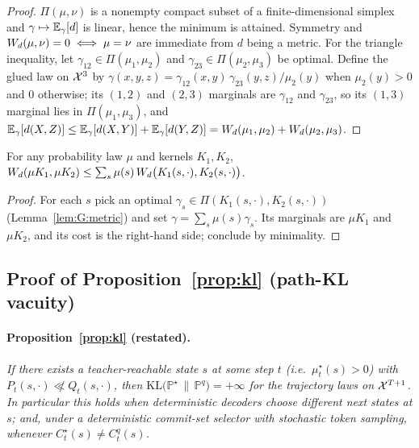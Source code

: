 \begin{proof}
$\Pi(\mu,\nu)$ is a nonempty compact subset of a finite-dimensional simplex and
$\gamma\mapsto\mathbb{E}_{\gamma}[d]$ is linear, hence the minimum is attained. Symmetry and
$W_{d}(\mu,\nu)=0\iff\mu=\nu$ are immediate from $d$ being a metric. For the triangle inequality,
let $\gamma_{12}\in\Pi(\mu_{1},\mu_{2})$ and $\gamma_{23}\in\Pi(\mu_{2},\mu_{3})$ be optimal.
Define the glued law on $\mathcal{X}^{3}$ by
$\gamma(x,y,z)=\gamma_{12}(x,y)\,\gamma_{23}(y,z)/\mu_{2}(y)$ when $\mu_{2}(y)>0$ and $0$
otherwise; its $(1,2)$ and $(2,3)$ marginals are $\gamma_{12}$ and $\gamma_{23}$, so its $(1,3)$
marginal lies in $\Pi(\mu_{1},\mu_{3})$, and
$\mathbb{E}_{\gamma}[d(X,Z)]\le\mathbb{E}_{\gamma}[d(X,Y)]+\mathbb{E}_{\gamma}[d(Y,Z)]
=W_{d}(\mu_{1},\mu_{2})+W_{d}(\mu_{2},\mu_{3})$.
\end{proof}

\begin{lemma}
\label{lem:G:convex}
For any probability law $\mu$ and kernels $K_{1},K_{2}$,
$W_{d}(\mu K_{1},\mu K_{2})\le\sum_{s}\mu(s)\,W_{d}\big(K_{1}(s,\cdot),K_{2}(s,\cdot)\big)$.
\end{lemma}

\begin{proof}
For each $s$ pick an optimal $\gamma_{s}\in\Pi(K_{1}(s,\cdot),K_{2}(s,\cdot))$
(Lemma~\ref{lem:G:metric}) and set $\gamma=\sum_{s}\mu(s)\gamma_{s}$. Its marginals are
$\mu K_{1}$ and $\mu K_{2}$, and its cost is the right-hand side; conclude by minimality.
\end{proof}

\subsection{Proof of Proposition~\ref{prop:kl} (path-KL vacuity)}
\label{app:proofs:kl}

\paragraph{Proposition~\ref{prop:kl} (restated).}
\emph{If there exists a teacher-reachable state $s$ at some step $t$ (i.e.\ $\mu^{\star}_{t}(s)>0$)
with $P_{t}(s,\cdot)\not\ll Q_{t}(s,\cdot)$, then
$\mathrm{KL}\big(\mathbb{P}^{\star}\,\big\|\,\mathbb{P}^{q}\big)=+\infty$ for the trajectory laws
on $\mathcal{X}^{T+1}$. In particular this holds when deterministic decoders choose different next states
at $s$; and, under a deterministic commit-set selector with stochastic token sampling, whenever
$C^{\star}_{t}(s)\neq C^{q}_{t}(s)$.}

